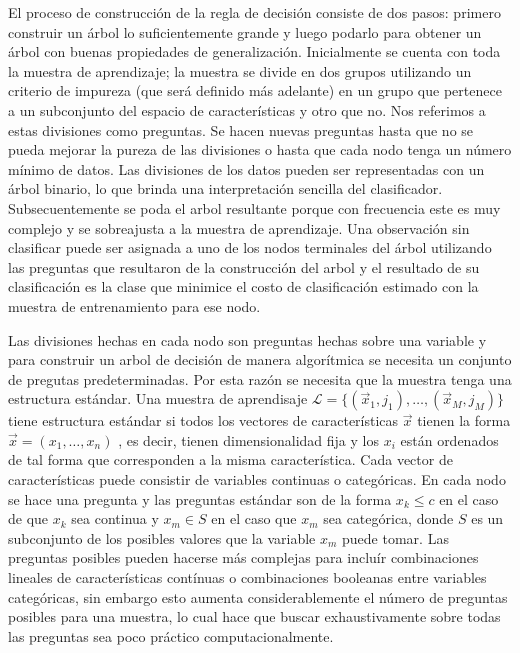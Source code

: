 \documentclass[letterpaper,12pt]{book}
\begin{document}
El proceso de construcción de la regla de decisión consiste de dos pasos: primero construir un árbol lo suficientemente grande y luego podarlo para obtener un árbol con buenas propiedades de generalización. Inicialmente se cuenta con toda la muestra de aprendizaje; la muestra se divide en dos grupos utilizando un criterio de impureza (que será definido más adelante) en un grupo que pertenece a un subconjunto del espacio de características y otro que no. Nos referimos a estas divisiones como preguntas. Se hacen nuevas preguntas hasta que no se pueda mejorar  la pureza de las divisiones o hasta que cada nodo tenga un número mínimo de datos. Las divisiones de los datos pueden ser representadas con un árbol binario, lo que brinda una interpretación sencilla del clasificador. Subsecuentemente se poda el arbol resultante porque con frecuencia este es muy complejo y se sobreajusta a la muestra de aprendizaje. Una observación sin clasificar puede ser asignada  a uno de los nodos terminales del árbol utilizando las preguntas que resultaron de la construcción del arbol y el resultado de su clasificación es la clase que minimice el costo de clasificación estimado con la muestra de entrenamiento para ese nodo.  

Las divisiones hechas en cada nodo son preguntas hechas sobre una variable y para construir un arbol de decisión  de manera algorítmica se necesita un conjunto de pregutas predeterminadas. Por esta razón se necesita que la muestra tenga una estructura estándar. Una muestra de aprendisaje $\mathcal{L} = \{(\vec{x}_1,j_1),\dots,(\vec{x}_M,j_M)\}$ tiene estructura estándar si todos los vectores de características $\vec{x}$ tienen la forma $\vec{x} = (x_{1},\dots,x_{n})$ , es decir, tienen dimensionalidad fija y los $x_i$ están ordenados de tal forma que corresponden a la misma característica. Cada vector de características puede consistir de variables continuas o categóricas. En cada nodo se hace una pregunta y las preguntas estándar son de la forma $x_k\leq c$ en el caso de que $x_k$ sea continua y $x_m\in S$ en el caso que $x_m$ sea categórica, donde $S$ es un subconjunto de los posibles valores que la variable $x_m$ puede tomar. Las preguntas posibles pueden hacerse más complejas para incluír combinaciones lineales de características contínuas o combinaciones booleanas entre variables categóricas, sin embargo esto aumenta considerablemente el número de preguntas posibles para una muestra, lo cual hace que buscar exhaustivamente sobre todas las preguntas sea poco práctico computacionalmente.
\end{document}
